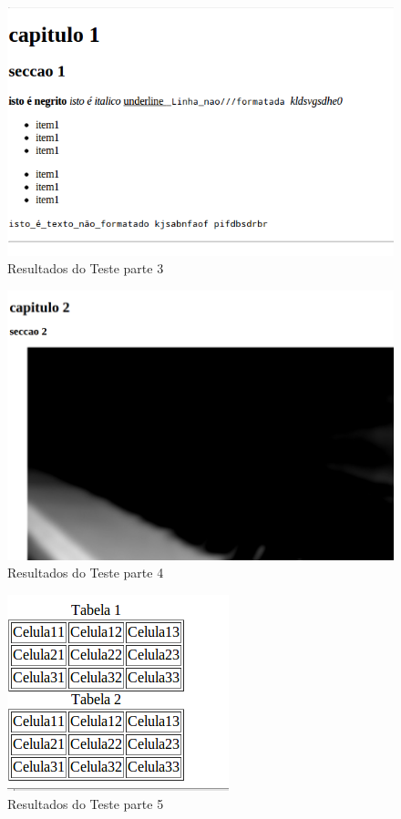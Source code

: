 \documentclass{report}
\begin{document}
\begin{figure}[h!]
\centering
\includegraphics[scale=0.3]{HTML3.JPG}
\caption{Resultados do Teste parte 3}
\label{threadsVsSync}
\end{figure}

\begin{figure}[h!]
\centering
\includegraphics[scale=0.3]{HTML4.JPG}
\caption{Resultados do Teste parte 4}
\label{threadsVsSync}
\end{figure}

\begin{figure}[h!]
\centering
\includegraphics[scale=0.3]{HTML5.JPG}
\caption{Resultados do Teste parte 5}
\label{threadsVsSync}
\end{figure}
\end{document}
